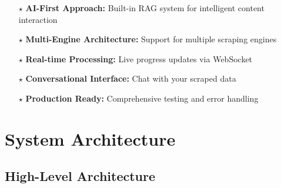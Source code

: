 \documentclass[12pt,a4paper]{report}
\begin{document}
\begin{itemize}[leftmargin=2cm]
    \item[\textcolor{warningred}{$\star$}] \textbf{AI-First Approach:} Built-in RAG system for intelligent content interaction
    \item[\textcolor{warningred}{$\star$}] \textbf{Multi-Engine Architecture:} Support for multiple scraping engines
    \item[\textcolor{warningred}{$\star$}] \textbf{Real-time Processing:} Live progress updates via WebSocket
    \item[\textcolor{warningred}{$\star$}] \textbf{Conversational Interface:} Chat with your scraped data
    \item[\textcolor{warningred}{$\star$}] \textbf{Production Ready:} Comprehensive testing and error handling
\end{itemize}

\chapter{System Architecture}

\section{High-Level Architecture}
\end{document}
